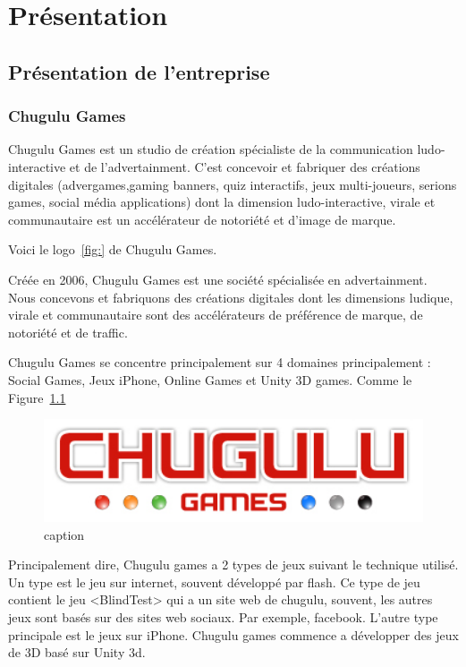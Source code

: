 \chapter{Présentation} %

\section{Présentation de l'entreprise} %

\subsection{Chugulu Games} %

Chugulu Games est un studio de création spécialiste de la communication ludo-interactive et de l'advertainment. C'est concevoir et fabriquer des créations digitales (advergames,gaming banners, quiz interactifs, jeux multi-joueurs, serions games, social média applications) dont la dimension ludo-interactive, virale et communautaire est un accélérateur de notoriété et d'image de marque.

Voici le logo~\ref{fig:} de Chugulu Games.

Créée en 2006, Chugulu Games est une société spécialisée en advertainment. Nous concevons et fabriquons des créations digitales dont les dimensions ludique, virale et communautaire sont des accélérateurs de préférence de marque, de notoriété et de traffic.

Chugulu Games se concentre principalement sur 4 domaines principalement : Social Games, Jeux iPhone, Online Games et Unity 3D games. Comme le Figure~\ref{fig:Image_Chugulu_Games1} 

\begin{figure}[htbp]  \centering   \includegraphics[width=6in]{Image/Chugulu-Games1.jpg}  \caption{caption}  \label{fig:Image_Chugulu_Games1} \end{figure}

Principalement dire, Chugulu games a 2 types de jeux suivant le technique utilisé. Un type est le jeu sur internet, souvent développé par flash. Ce type de jeu contient le jeu <BlindTest> qui a un site web de chugulu, souvent, les autres jeux sont basés sur des sites web sociaux. Par exemple, facebook. L'autre type principale est le jeux sur iPhone. Chugulu games commence a développer des jeux de 3D basé sur Unity 3d. 

